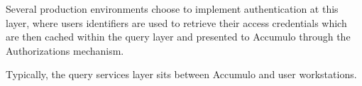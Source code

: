 Several production environments choose to implement authentication at this layer,
where users identifiers are used to retrieve their access credentials which are then
cached within the query layer and presented to Accumulo through the
Authorizations mechanism.

Typically, the query services layer sits between Accumulo and user workstations.

